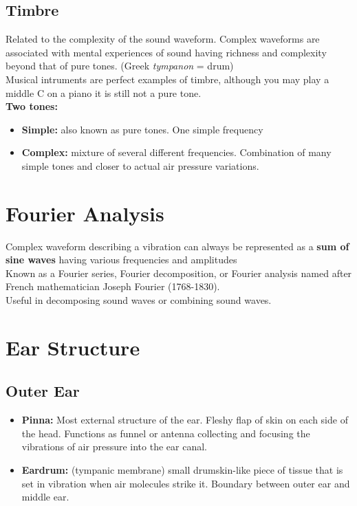 \documentclass{article}
\begin{document}
\subsection{Timbre}
Related to the complexity of the sound waveform. Complex waveforms are associated with mental experiences of sound having richness and complexity beyond that of pure tones. (Greek \textit{tympanon} = drum) \\
Musical intruments are perfect examples of timbre, although you may play a middle C on a piano it is still not a pure tone. \\ 

\textbf{Two tones:}
\begin{itemize}
    \item \textbf{Simple:} also known as pure tones. One simple frequency 
    \item \textbf{Complex:} mixture of several different frequencies. Combination of many simple tones and closer to actual air pressure variations. 
\end{itemize}

\newpage 
\section{Fourier Analysis}
Complex waveform describing a vibration can always be represented as a \textbf{sum of sine waves} having various frequencies and amplitudes \\
Known as a Fourier series, Fourier decomposition, or Fourier analysis named after French mathematician Joseph Fourier (1768-1830). \\ 

\noindent Useful in decomposing sound waves or combining sound waves. 

\section{Ear Structure}

\subsection{Outer Ear}
\begin{itemize}
    \item \textbf{Pinna:} Most external structure of the ear. Fleshy flap of skin on each side of the head. 
        \subitem Functions as funnel or antenna collecting and focusing the vibrations of air pressure into the ear canal. 
    \item \textbf{Eardrum:} (tympanic membrane) small drumskin-like piece of tissue that is set in vibration when air molecules strike it. Boundary between outer ear and middle ear.
\end{itemize}
\end{document}
